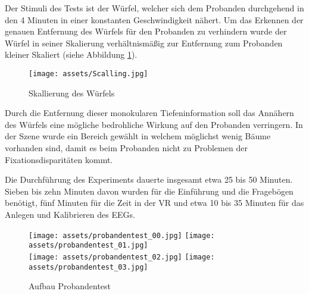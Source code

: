 \documentclass[conference]{IEEEtran}
\begin{document}
Der Stimuli des Tests ist der Würfel, welcher sich dem Probanden durchgehend in den 4 Minuten in einer konstanten Geschwindigkeit nähert. Um das Erkennen der genauen Entfernung des Würfels für den Probanden zu verhindern wurde der Würfel in seiner Skalierung verhältnismäßig zur Entfernung zum Probanden kleiner Skaliert (siehe Abbildung \ref{fig:scale_cube}). 
\begin{figure}[ht]
	\centering
	\texttt{[image: assets/Scalling.jpg]} \\
	\caption{Skallierung des Würfels}
	\label{fig:scale_cube}
\end{figure}
Durch die Entfernung dieser monokularen Tiefeninformation soll das Annähern des Würfels eine mögliche bedrohliche Wirkung auf den Probanden verringern. In der Szene wurde ein Bereich gewählt in welchem möglichst wenig Bäume  vorhanden sind, damit es beim Probanden nicht zu Problemen der Fixationsdisparitäten kommt.

Die Durchführung des Experiments dauerte insgesamt etwa 25 bis 50 Minuten. Sieben bis zehn Minuten davon wurden für die Einführung und die Fragebögen benötigt, fünf Minuten für die Zeit in der VR und etwa 10 bis 35 Minuten für das Anlegen und Kalibrieren des EEGs. 

\begin{figure}[ht]
	\centering
	\texttt{[image: assets/probandentest\_00.jpg]} \hspace{-5pt}
	\texttt{[image: assets/probandentest\_01.jpg]} \\
	\vspace{2pt}
	\texttt{[image: assets/probandentest\_02.jpg]} \hspace{-5pt}
	\texttt{[image: assets/probandentest\_03.jpg]} \hspace{-5pt}
	\caption{Aufbau Probandentest}
	\label{fig:structure_probandentest}
\end{figure}
\end{document}
